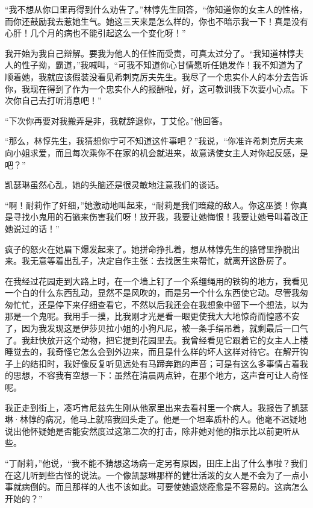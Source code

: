 \par “我不想从你口里再得到什么劝告了。”林惇先生回答，“你知道你的女主人的性格，而你还鼓励我去惹她生气。她这三天来是怎么样的，你也不暗示我一下！真是没有心肝！几个月的病也不能引起这么一个变化呀！”
\par 我开始为我自己辩解。要我为他人的任性而受责，可真太过分了。“我知道林惇夫人的性子拗，霸道，”我喊叫，“可我不知道你心甘情愿听任她发作！我不知道为了顺着她，我就应该假装没看见希刺克厉夫先生。我尽了一个忠实仆人的本分去告诉你，我现在得到了作为一个忠实仆人的报酬啦，好，这可教训我下次要小心点。下次你自己去打听消息吧！”
\par “下次你再要对我搬弄是非，我就辞退你，丁艾伦。”他回答。
\par “那么，林惇先生，我猜想你宁可不知道这件事吧？”我说，“你准许希刺克厉夫来向小姐求爱，而且每次乘你不在家的机会就进来，故意诱使女主人对你起反感，是吧？”
\par 凯瑟琳虽然心乱，她的头脑还是很灵敏地注意我们的谈话。
\par “啊！耐莉作了奸细，”她激动地叫起来，“耐莉是我们暗藏的敌人。你这巫婆！你真是寻找小鬼用的石镞来伤害我们呀！放开我，我要让她悔恨！我要让她号叫着改正她说过的话！”
\par 疯子的怒火在她眉下爆发起来了。她拼命挣扎着，想从林惇先生的胳臂里挣脱出来。我无意等着出乱子，决定自作主张：去找医生来帮忙，就离开这卧房了。
\par 在我经过花园走到大路上时，在一个墙上钉了一个系缰绳用的铁钩的地方，我看见一个白的什么东西乱动，显然不是风吹的，而是另一个什么东西使它动。尽管我匆匆忙忙，还是停下来仔细查看它，不然以后我还会在我想象中留下一个想法，以为那是一个鬼呢。我用手一摸，比我刚才光是看一眼更使我大大地惊奇而惶惑不安了，因为我发现这是伊莎贝拉小姐的小狗凡尼，被一条手绢吊着，就剩最后一口气了。我赶快放开这个动物，把它提到花园里去。我曾经看见它跟着它的女主人上楼睡觉去的，我奇怪它怎么会到外边来，而且是什么样的坏人这样对待它。在解开钩子上的结扣时，我好像反复听见远处有马蹄奔跑的声音；可是有这么多事情占着我的思想，不容我有空想一下：虽然在清晨两点钟，在那个地方，这声音可让人奇怪呢。
\par 我正走到街上，凑巧肯尼兹先生刚从他家里出来去看村里一个病人。我报告了凯瑟琳·林惇的病况，他马上就陪我回头走了。他是一个坦率质朴的人。他毫不迟疑地说出他怀疑她是否能安然度过这第二次的打击，除非她对他的指示比以前更听从些。
\par “丁耐莉，”他说，“我不能不猜想这场病一定另有原因，田庄上出了什么事啦？我们在这儿听到些古怪的说法。一个像凯瑟琳那样的健壮活泼的女人是不会为了一点小事就病倒的。而且那样的人也不该如此。可要使她退烧痊愈是不容易的。这病怎么开始的？”
